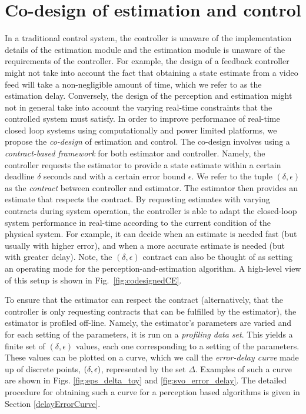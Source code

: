 \section{Co-design of estimation and control}
\label{sec:codesign}

In a traditional control system, %
the controller is unaware of the implementation details of the estimation module and the estimation module is unaware of the requirements of the controller.
For example, the design of a feedback controller might not take into account the fact that obtaining a state estimate from a video feed will take a non-negligible amount of time, which we refer to as the estimation delay.
Conversely, the design of the perception and estimation might not in general take into account the varying real-time constraints that the controlled system must satisfy. %
In order to improve performance of real-time closed loop systems using computationally and power limited platforms, we propose the \emph{co-design} of estimation and control.
The co-design involves using a \emph{contract-based framework} for both estimator and controller.
Namely, the controller requests the estimator to provide a state estimate within a certain deadline $\delta$ seconds and with a certain error bound $\epsilon$.
We refer to the tuple $(\delta,\epsilon)$ as the \emph{contract} between controller and estimator. 
The estimator then provides an estimate that respects the contract.
By requesting estimates with varying contracts during system operation, the controller is able to adapt the closed-loop system performance in real-time according to the current condition of the physical system.
For example, it can decide when an estimate is needed fast (but usually with higher error), and when a more accurate estimate is needed (but with greater delay). Note, the $(\delta,\epsilon)$ contract can also be thought of as setting an operating mode for the perception-and-estimation algorithm. A high-level view of this setup is shown in Fig.~\ref{fig:codesignedCE}.

To ensure that the estimator can respect the contract (alternatively, that the controller is only requesting contracts that can be fulfilled by the estimator), the estimator is profiled off-line.
Namely, the estimator's parameters are varied and for each setting of the parameters, it is run on a \emph{profiling data set}. 
This yields a finite set of $(\delta,\epsilon)$ values, each one corresponding to a setting of the parameters.
These values can be plotted on a curve, which we call the \emph{error-delay curve} made up of discrete points, $(\delta,\epsilon)$, represented by the set $\Delta$. Examples of such a curve are shown in Figs. \ref{fig:eps_delta_toy} and \ref{fig:svo_error_delay}.
The detailed procedure for obtaining such a curve for a perception based algorithms is given in Section \ref{delayErrorCurve}.


